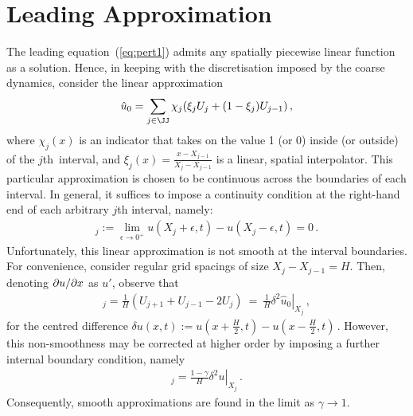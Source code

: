 \documentclass[12pt,a5paper]{article}
\begin{document}
\section{Leading Approximation}
The leading equation~(\ref{eq:pert1}) admits any spatially piecewise linear function as a solution. 
Hence, in keeping
with the discretisation imposed by the coarse dynamics, 
consider the linear approximation
\begin{eqnarray}
   \hat{u}_0 = \sum_{j\in\JJ}\chi_j(\xi_j U_j+(1-\xi_j)U_{j-1})\,,
\label{eq:uhat0}
\end{eqnarray}
where $\chi_j(x)$ is an indicator that takes on the value 1 (or 0) inside (or outside) of the $j$th~interval, and 
$\xi_j(x)=\frac{x-X_{j-1}}{X_j-X_{j-1}}$ is a linear, spatial interpolator.
This particular approximation is chosen to be continuous across the boundaries of each interval. 
In general, it suffices 
to impose a continuity condition at the right-hand end of each arbitrary $j$th interval, namely:
\begin{eqnarray}
   [u]_j := \lim_{\epsilon\rightarrow 0^{+}} u(X_j+\epsilon,t)-u(X_j-\epsilon,t)= 0\,.
\label{eq:cont-cond}
\end{eqnarray}
Unfortunately, this linear approximation is not smooth at the interval boundaries. 
For convenience, consider regular grid spacings of size 
$X_j-X_{j-1}=H$. Then, denoting $\D xu$ as $u'$, observe that
\begin{eqnarray}
   [\hat{u}'_1]_j = \frac{1}{H}(U_{j+1}+U_{j-1}-2U_j)~=~\frac{1}{H}\left.\delta^{2}\hat{u}_0\right|_{X_j}\,,
\end{eqnarray}
for the centred difference $\delta u(x,t):= u(x+\frac{H}{2},t)-u(x-\frac{H}{2},t)$\,.
However, this non-smoothness may be corrected at higher order by imposing a further internal boundary condition, namely
\begin{eqnarray}
   [u']_j = \frac{1-\gamma}{H}\left.\delta^{2}u\right|_{X_j}\,.
\label{eq:smooth-cond}
\end{eqnarray}
Consequently, smooth approximations are found in the limit as $\gamma\rightarrow 1$.
\end{document}
